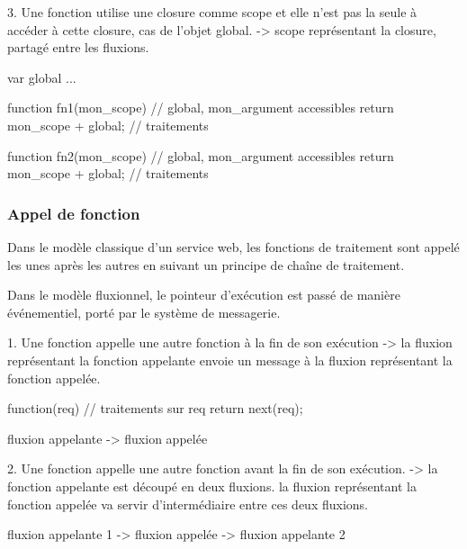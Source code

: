 			3. Une fonction utilise une closure comme scope et elle n'est pas la seule à accéder à cette closure, cas de l'objet global.
			    -> scope représentant la closure, partagé entre les fluxions.

			\begin{code}[Javascript, caption={Code fluxionnel},label={lst:mem3}]
				var global ...

				function fn1(mon_scope) {
				    // global, mon_argument accessibles
				    return mon_scope + global; // traitements
				}

				function fn2(mon_scope) {
				    // global, mon_argument accessibles
				    return mon_scope + global; // traitements
				}
			\end{code}

		\subsubsection{Appel de fonction}

			Dans le modèle classique d'un service web, les fonctions de traitement sont appelé les unes après les autres en suivant un principe de chaîne de traitement.

			Dans le modèle fluxionnel, le pointeur d'exécution est passé de manière événementiel, porté par le système de messagerie.

			1. Une fonction appelle une autre fonction à la fin de son exécution
			    -> la fluxion représentant la fonction appelante envoie un message à la fluxion représentant la fonction appelée.

			\begin{code}[Javascript, caption={Code fluxionnel},label={lst:fn1}]
				function(req) {
				    // traitements sur req
				    return next(req);
				}
			\end{code}

			fluxion appelante -> fluxion appelée

			2. Une fonction appelle une autre fonction avant la fin de son exécution.
			    -> la fonction appelante est découpé en deux fluxions.
			    la fluxion représentant la fonction appelée va servir d'intermédiaire entre ces deux fluxions.

			fluxion appelante 1 -> fluxion appelée -> fluxion appelante 2
